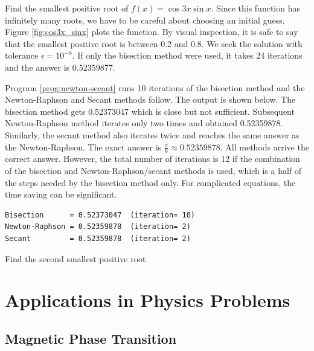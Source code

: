 \vspace{18px}
\begin{example}\label{ex:cos3x_sinx}

\medskip
Find the smallest positive root of $f(x)=\cos 3x \sin x$.  Since 
this function has infinitely many roots, we have to be careful about choosing an initial guess.
Figure \ref{fig:cos3x_sinx} plots the function.  By visual inspection, it is safe to say that the smallest positive root is between 0.2 and 0.8. We seek the solution with tolerance $\epsilon = 10^{-8}$.  If only the bisection method were used, it takes 24 iterations and the answer is 0.52359877.  

Program \ref{prog:newton-secant} runs 10 iterations of the bisection method
and the Newton-Raphson and Secant methods follow.  The output is shown below. The bisection method gets 0.52373047 which is close but not sufficient.  Subsequent Newton-Raphson method iterates only two times and obtained 0.52359878.  Similarly, the secant method also iterates twice and reaches the same answer as the Newton-Raphson.  
The exact answer is $\frac{\pi}{6} \approx 0.52359878$.  All methods arrive the correct answer. However,  the total number of iterations is 12 if the combination of the bisection and Newton-Raphson/secant methods is used, which is a half of the steps needed by the bisection method only.  For complicated equations, the time saving can be significant.
\begin{mybox}
\small
\begin{verbatim}
Bisection      = 0.52373047  (iteration= 10)
Newton-Raphson = 0.52359878  (iteration= 2)
Secant         = 0.52359878  (iteration= 2)
\end{verbatim}
\normalsize
\end{mybox}
\end{example}

\vspace{18px}
\noindent
\exercise
Find the second smallest positive root.

\newpage
\noindent
\section{Applications in Physics Problems}


\noindent
\subsection{Magnetic Phase Transition}

